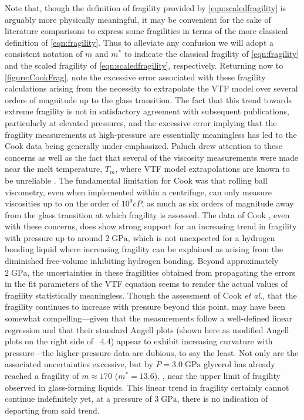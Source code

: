 	\noindent Note that, though the definition of fragility provided by \eqn\nolinebreak \ref{eqn:scaledfragility}  is arguably more physically meaningful, it may be convenient for the sake of literature comparisons to express some fragilities in terms of the more classical definition of \eqn\nolinebreak \ref{eqn:fragility}.  Thus to alleviate any confusion we will adopt a consistent notation of $m$ and $m^*$ to indicate the classical fragility of \eqn\nolinebreak \ref{eqn:fragility} and the scaled fragility of \eqn\nolinebreak \ref{eqn:scaledfragility}, respectively.  Returning now to \fig \nolinebreak \ref{figure:CookFrag}, note the excessive error associated with these fragility calculations arising from the necessity to extrapolate the VTF model over several orders of magnitude up to the glass transition.  The fact that this trend towards extreme fragility is not in satisfactory agreement with subsequent publications, particularly at elevated pressures, and the excessive error implying that the fragility measurements at high-pressure are essentially meaningless has led to the Cook \etal data being generally under-emphasized.  Paluch \etal drew attention to these concerns as well as the fact that several of the viscosity measurements were made near the melt temperature, $T_m$, where VTF model extrapolations are known to be unreliable \nolinebreak\cite{Paluch}.  The fundamental limitation for Cook \etal was that rolling ball viscometry, even when implemented within a centrifuge, can only measure viscosities up to on the order of $10^9cP$\textemdash \ie, as much as six orders of magnitude away from the glass transition at which fragility is assessed.  The data of Cook \etal, even with these concerns, does show strong support for an increasing trend in fragility with pressure up to around $2\;\si{\giga\pascal}$, which is not unexpected for a hydrogen bonding liquid where increasing fragility can be explained as arising from the diminished free-volume inhibiting hydrogen bonding.  Beyond approximately $2\;\si{\giga\pascal}$, the uncertainties in these fragilities obtained from propagating the errors in the fit parameters of the VTF equation seems to render the actual values of fragility statistically meaningless. Though the assessment of Cook \textit{et al.}, that the fragility continues to increase with pressure beyond this point, may have been somewhat compelling—given that the measurements follow a well-defined linear regression and that their standard Angell plots (shown here as modified Angell plots on the right side of \fig~4.4) appear to exhibit increasing curvature with pressure—the higher-pressure data are dubious, to say the least. Not only are the associated uncertainties excessive, but by $P = 3.0\;\si{\giga\pascal}$ glycerol has already reached a fragility of $m \approx 170$ ($m^* = 13.6$), \ie, near the upper limit of fragility observed in glass-forming liquids.  This linear trend in fragility certainly cannot continue indefinitely yet, at a pressure of $3\;\si{\giga\pascal}$, there is no indication of departing from said trend. 
	
